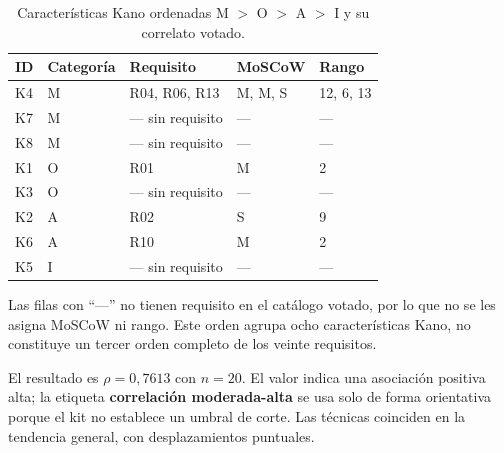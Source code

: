 \begin{table}[htbp]
\centering
\footnotesize
\caption{Características Kano ordenadas M $>$ O $>$ A $>$ I y su correlato votado.}
\label{tab:orden_kano}
\begin{tabular}{@{}lllll@{}}
\toprule
ID & Categoría & Requisito & MoSCoW & Rango \\
\midrule
K4 & M & R04, R06, R13 & M, M, S & 12, 6, 13 \\
K7 & M & --- sin requisito & --- & --- \\
K8 & M & --- sin requisito & --- & --- \\
K1 & O & R01 & M & 2 \\
K3 & O & --- sin requisito & --- & --- \\
K2 & A & R02 & S & 9 \\
K6 & A & R10 & M & 2 \\
K5 & I & --- sin requisito & --- & --- \\
\bottomrule
\end{tabular}
\end{table}

Las filas con ``---'' no tienen requisito en el catálogo votado, por lo que no se les asigna MoSCoW ni rango. Este orden agrupa ocho características Kano, no constituye un tercer orden completo de los veinte requisitos.

El resultado es $\rho = 0{,}7613$ con $n=20$. El valor indica una asociación positiva alta; la etiqueta \textbf{correlación moderada-alta} se usa solo de forma orientativa porque el kit no establece un umbral de corte. Las técnicas coinciden en la tendencia general, con desplazamientos puntuales.

